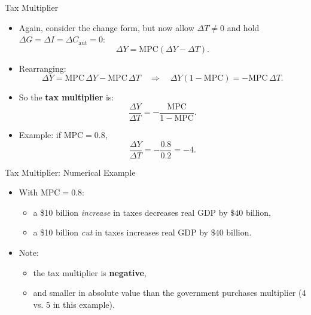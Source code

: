 \documentclass[aspectratio=169]{beamer}
\begin{document}
\begin{frame}{Tax Multiplier}
\transfade
\begin{itemize}
  \item Again, consider the change form, but now allow \(\Delta T \neq 0\) and hold \(\Delta G = \Delta I = \Delta C_{\text{aut}} = 0\):
  \[
    \Delta Y = \text{MPC} (\Delta Y - \Delta T).
  \]
  \item Rearranging:
  \[
    \Delta Y = \text{MPC} \,\Delta Y - \text{MPC} \,\Delta T
    \quad \Rightarrow \quad
    \Delta Y (1 - \text{MPC}) = - \text{MPC} \,\Delta T.
  \]
  \item So the \textbf{tax multiplier} is:
  \[
    \frac{\Delta Y}{\Delta T} = - \frac{\text{MPC}}{1 - \text{MPC}}.
  \]
  \item Example: if \(\text{MPC} = 0.8\),
  \[
    \frac{\Delta Y}{\Delta T} = -\frac{0.8}{0.2} = -4.
  \]
\end{itemize}
\end{frame}

\begin{frame}{Tax Multiplier: Numerical Example}
\transfade
\begin{itemize}
  \item With \(\text{MPC} = 0.8\):
  \begin{itemize}
    \item a \$10 billion \emph{increase} in taxes decreases real GDP by \(\$40\) billion,
    \item a \$10 billion \emph{cut} in taxes increases real GDP by \(\$40\) billion.
  \end{itemize}
  \item Note:
  \begin{itemize}
    \item the tax multiplier is \textbf{negative},
    \item and smaller in absolute value than the government purchases multiplier
          (4 vs. 5 in this example).
  \end{itemize}
\end{itemize}
\end{frame}
\end{document}
